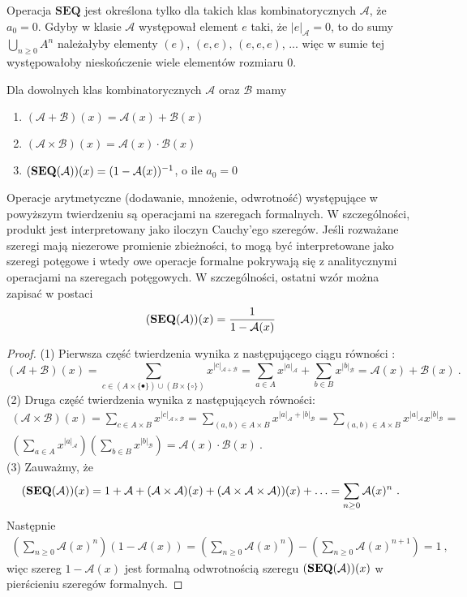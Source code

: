 Operacja $\mathbf{SEQ}$ jest określona tylko dla takich klas kombinatorycznych $\mathcal{A}$, że $a_0 = 0$. Gdyby w klasie $\mathcal{A}$ występował element $e$ taki, że $|e|_{\mathcal{A}} = 0$, to do sumy 
$\bigcup_{n\geq 0} A^n$ należałyby elementy $(e)$, $(e,e)$, $(e,e,e)$, ... więc w sumie tej występowałoby nieskończenie wiele elementów rozmiaru $0$.

\begin{theorem} Dla dowolnych klas kombinatorycznych $\mathcal{A}$ oraz $\mathcal{B}$ mamy
\begin{enumerate}
\item $(\mathcal{A}+\mathcal{B})(x) = \mathcal{A}(x)+\mathcal{B}(x)$
\item $(\mathcal{A}\times\mathcal{B})(x) = \mathcal{A}(x)\cdot\mathcal{B}(x)$
\item $(\mathbf{SEQ}(\mathcal{A}))(x) = (1-\mathcal{A}(x))^{-1}$, o ile $a_0 = 0$
\end{enumerate}
\end{theorem}

Operacje arytmetyczne (dodawanie, mnożenie, odwrotność) występujące w powyższym twierdzeniu są operacjami na szeregach formalnych. W szczególności, produkt jest interpretowany jako iloczyn Cauchy'ego szeregów. Jeśli rozważane szeregi mają niezerowe promienie zbieżności, to mogą być interpretowane jako szeregi potęgowe i wtedy owe operacje formalne pokrywają się z analitycznymi operacjami na szeregach potęgowych. W szczególności, ostatni wzór można zapisać w postaci
$$
(\mathbf{SEQ}(\mathcal{A}))(x) = \frac{1}{1-\mathcal{A}(x)}
$$
\begin{proof}
(1) Pierwsza część twierdzenia wynika z następującego ciągu równości :
$$
(\mathcal{A}+\mathcal{B})(x) = 
    \sum_{c\in (A\times\{\bullet\})\cup (B\times\{\circ\})}{x^{|c|_{\mathcal{A}+\mathcal{B}}}} = 
    \sum_{a \in A}{x^{|a|_{\mathcal{A}}}} + \sum_{b \in B}{x^{|b|_{\mathcal{B}}}} = 
    \mathcal{A}(x)+\mathcal{B}(x) ~.
$$
(2) Druga część twierdzenia wynika z następujących równości:
\begin{gather*}
(\mathcal{A}\times \mathcal{B})(x) = 
\sum_{c\in A\times B}{x^{|c|_{\mathcal{A}\times\mathcal{B}}}} = 
\sum_{(a,b)\in A\times B}{x^{|a|_{\mathcal{A}}+|b|_{\mathcal{B}}}} = 
\sum_{(a,b)\in A\times B}{x^{|a|_{\mathcal{A}}}x^{|b|_{\mathcal{B}}}} =\\
    \left(\sum_{a\in A}{x^{|a|_{\mathcal{A}}}}\right)\left(\sum_{b\in B}{x^{|b|_{\mathcal{B}}}}\right) = 
\mathcal{A}(x)\cdot\mathcal{B}(x)~.
\end{gather*}
%
(3) Zauważmy, że
$$
(\mathbf{SEQ}(\mathcal{A}))(x) = 1+\mathcal{A}+(\mathcal{A}\times\mathcal{A})(x)+(\mathcal{A}\times\mathcal{A}\times\mathcal{A}))(x) + \ldots = 
\sum_{n\geq 0} \mathcal{A}(x)^n~.
$$
Następnie
\begin{gather*}
\left(\sum_{n\geq 0} \mathcal{A}(x)^n\right) (1-\mathcal{A}(x)) = 
\left(\sum_{n\geq 0} \mathcal{A}(x)^n\right) - 
\left(\sum_{n\geq 0} \mathcal{A}(x)^{n+1}\right) = 1~,
\end{gather*}
więc szereg $1-\mathcal{A}(x)$ jest formalną odwrotnością 
szeregu $(\mathbf{SEQ}(\mathcal{A}))(x)$ w pierścieniu szeregów formalnych.

\end{proof}


